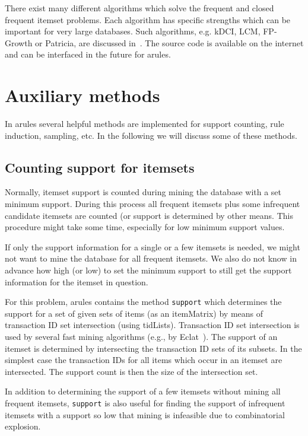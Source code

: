 \documentclass[10pt,a4paper]{article}
\newcommand{\strong}[1]{{\normalfont\fontseries{b}\selectfont #1}}
\newcommand{\class}[1]{\textsf{#1}}
\newcommand{\code}[1]{\texttt{#1}}
\newcommand{\pkg}[1]{\strong{#1}}
\begin{document}
There exist many different algorithms which solve the frequent 
and closed frequent itemset problems.
Each algorithm has specific strengths which can be important for
very large databases.
Such algorithms, e.g. kDCI, LCM, FP-Growth or Patricia, are
discussed in~\cite{arules:Goethals+Zaki:2003}.  
The source code is available on the internet and can be interfaced 
in the future for \pkg{arules}. 


\section{Auxiliary methods \label{sec:auxiliary}}

In \pkg{arules} several helpful methods are implemented for
support counting, rule induction, sampling, etc.
In the following we will discuss some of these methods.

\subsection{Counting support for itemsets\label{sec:counting}}
Normally, itemset support is counted during mining the database
with a set minimum support.
During this process all frequent itemsets plus some infrequent candidate
itemsets are counted (or support is determined by other means.
This procedure might take 
some time, especially for low minimum support values. 

If only the support information for a single or a few itemsets is needed,
we might not want to mine the database for all frequent itemsets. 
We also do not know in advance how high (or low) to set the minimum support to
still get the support information for the itemset in question.

For this problem, \pkg{arules} contains the method \code{support}
which determines the support for a set of given sets of items
(as an \class{itemMatrix}) by means of transaction ID set 
intersection (using \class{tidLists}).
Transaction ID set intersection is used by several fast mining algorithms 
(e.g., by Eclat~\citep{arules:Zaki+Parthasarathy+Ogihara+Li:1997}). 
The support of an itemset is determined by intersecting
the transaction ID sets of its subsets. In the simplest case 
the transaction IDs for all items which occur in an itemset are intersected.
The support count is then the size of the intersection set.

In addition to determining the support of a few itemsets without mining all
frequent itemsets, \code{support} is also useful for finding 
the support of infrequent itemsets with a support so low that mining
is infeasible due to combinatorial explosion.
\end{document}
